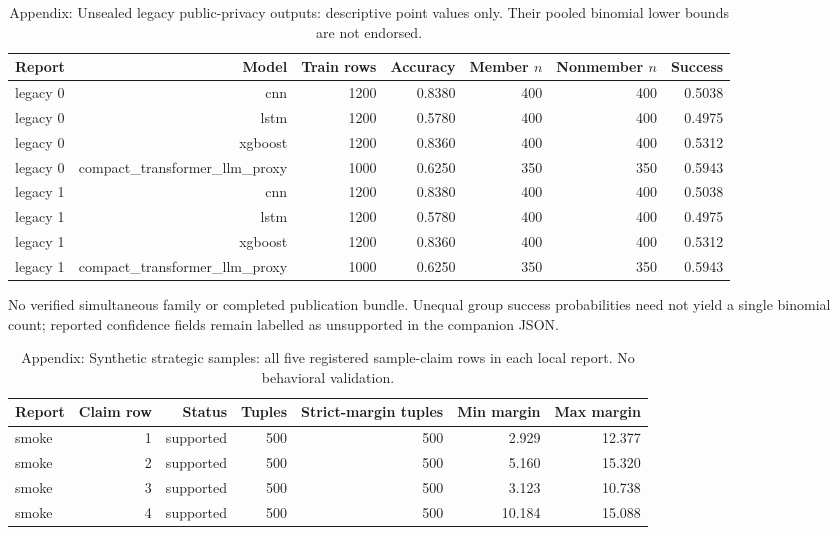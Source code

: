 {\begin{table}[t]
\end{table}
\begin{table}[t]
\centering\small
\caption{Appendix: Unsealed legacy public-privacy outputs: descriptive point values only. Their pooled binomial lower bounds are not endorsed.}
\label{tab:legacy}
\begin{tabular}{lrrrrrr}
\toprule
Report & Model & Train rows & Accuracy & Member $n$ & Nonmember $n$ & Success \\
\midrule
legacy 0 & cnn & 1200 & 0.8380 & 400 & 400 & 0.5038 \\
legacy 0 & lstm & 1200 & 0.5780 & 400 & 400 & 0.4975 \\
legacy 0 & xgboost & 1200 & 0.8360 & 400 & 400 & 0.5312 \\
legacy 0 & compact\_transformer\_llm\_proxy & 1000 & 0.6250 & 350 & 350 & 0.5943 \\
legacy 1 & cnn & 1200 & 0.8380 & 400 & 400 & 0.5038 \\
legacy 1 & lstm & 1200 & 0.5780 & 400 & 400 & 0.4975 \\
legacy 1 & xgboost & 1200 & 0.8360 & 400 & 400 & 0.5312 \\
legacy 1 & compact\_transformer\_llm\_proxy & 1000 & 0.6250 & 350 & 350 & 0.5943 \\
\bottomrule
\end{tabular}
\par\smallskip
\begin{minipage}{\textwidth}\small No verified simultaneous family or completed publication bundle. Unequal group success probabilities need not yield a single binomial count; reported confidence fields remain labelled as unsupported in the companion JSON.\end{minipage}
\end{table}
\begin{table}[t]
\centering\small
\caption{Appendix: Synthetic strategic samples: all five registered sample-claim rows in each local report. No behavioral validation.}
\label{tab:strategic}
\begin{tabular}{lrrrrrr}
\toprule
Report & Claim row & Status & Tuples & Strict-margin tuples & Min margin & Max margin \\
\midrule
smoke & 1 & supported & 500 & 500 & 2.929 & 12.377 \\
smoke & 2 & supported & 500 & 500 & 5.160 & 15.320 \\
smoke & 3 & supported & 500 & 500 & 3.123 & 10.738 \\
smoke & 4 & supported & 500 & 500 & 10.184 & 15.088 \\

\end{tabular}
\end{table}}
